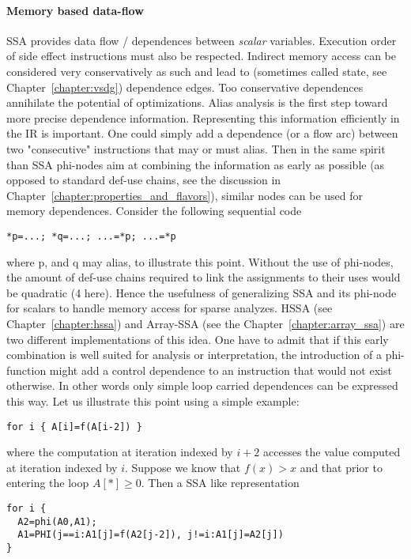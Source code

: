 \paragraph{Memory based data-flow}
SSA provides data flow / dependences between \emph{scalar} variables. Execution order of side effect instructions must also be respected. Indirect memory access can be considered very conservatively as such and lead to (sometimes called state, see Chapter~\ref{chapter:vsdg}) dependence edges. Too conservative dependences annihilate the potential of optimizations. Alias analysis is the first step toward more precise dependence information. Representing this information efficiently in the IR is important. One could simply add a dependence (or a flow arc) between two "consecutive" instructions that may or must alias. Then in the same spirit than SSA phi-nodes aim at combining the information as early as possible (as opposed to standard def-use chains, see the discussion in Chapter~\ref{chapter:properties_and_flavors}), similar nodes can be used for memory dependences. Consider the following sequential code 
\begin{verbatim}
*p=...; *q=...; ...=*p; ...=*p
\end{verbatim}
 where p, and q may alias, to illustrate this point. Without the use of phi-nodes, the amount of def-use chains required to link the assignments to their uses would be quadratic (4 here). Hence the usefulness of generalizing SSA and its phi-node for scalars to handle memory access for sparse analyzes. HSSA (see Chapter~\ref{chapter:hssa}) and Array-SSA (see the Chapter~\ref{chapter:array_ssa}) are two different implementations of this idea. One have to admit that if this early combination is well suited for analysis or interpretation, the introduction of a phi-function might add a control dependence to an instruction that would not exist otherwise. In other words only simple loop carried dependences can be expressed this way. Let us illustrate this point using a simple example: 
\begin{verbatim}
for i { A[i]=f(A[i-2]) }
\end{verbatim}
where the computation at iteration indexed by $i+2$ accesses the value computed at iteration indexed by $i$. Suppose we know that $f(x)>x$ and that prior to entering the loop $A[*]\geq 0$. Then a SSA like representation 
\begin{verbatim}
for i { 
  A2=phi(A0,A1); 
  A1=PHI(j==i:A1[j]=f(A2[j-2]), j!=i:A1[j]=A2[j]) 
}
\end{verbatim}
